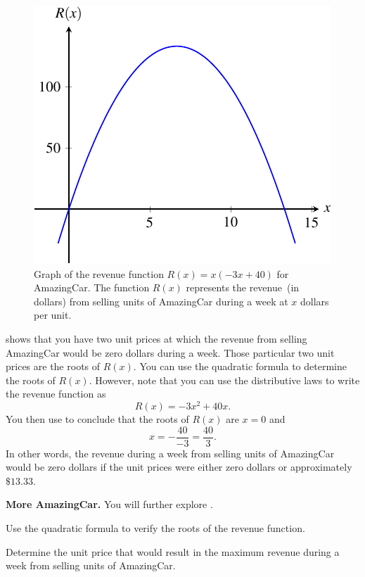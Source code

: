 \documentclass[a4paper,oneside,12pt]{article}
\begin{document}
\begin{solution}
\begin{figure}[!htbp]
\centering
\includegraphics[scale=1.1]{image/10/amazingcar-revenue.pdf}
\caption{%
  Graph of the revenue function $R(x) = x(-3x + 40)$ for AmazingCar.
  The function $R(x)$ represents the revenue~(in dollars) from selling
  units of AmazingCar during a week at $x$ dollars per unit.
}
\label{fig:AmazingCar_revenue}
\end{figure}

 shows that you have two unit prices at
which the revenue from selling AmazingCar would be zero dollars during
a week.  Those particular two unit prices are the roots of $R(x)$.
You can use the quadratic formula to determine the roots of $R(x)$.
However, note that you can use the distributive laws to write the
revenue function as
\begin{equation}
\label{eqn:AmazingCar_revenue_function_distributive}
R(x)
=
-3x^2 + 40x.
\end{equation}
You then use 
to conclude that the roots of $R(x)$ are $x = 0$ and
\[
x
=
-\frac{40}{-3}
=
\frac{40}{3}.
\]
In other words, the revenue during a week from selling units of
AmazingCar would be zero dollars if the unit prices were either zero
dollars or approximately $\$13.33$.
\end{solution}

\begin{exercise}
\textbf{More AmazingCar.}
You will further explore .
\begin{packedenum}
\item\label{subeg:AmazingCar_roots_quadratic_formula}
  Use the quadratic formula to verify the roots of the revenue
  function.

\item\label{subeg:AmazingCar_maximum_revenue}
  Determine the unit price that would result in the maximum revenue
  during a week from selling units of AmazingCar.
\end{packedenum}
\end{exercise}
\end{document}

